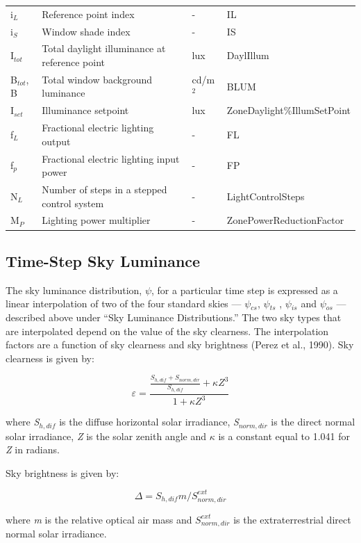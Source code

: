 \begin{longtable}[c]{p{1.0in}p{2.0in}p{1.0in}p{2.0in}}
i\(_{L}\) & Reference point index & - & IL \tabularnewline
i\(_{S}\) & Window shade index & - & IS \tabularnewline
I\(_{tot}\) & Total daylight illuminance at reference point & lux & DaylIllum \tabularnewline
B\(_{tot}\), B & Total window background luminance & cd/m\(^{2}\) & BLUM \tabularnewline
I\(_{set}\) & Illuminance setpoint & lux & ZoneDaylight\%IllumSetPoint \tabularnewline
f\(_{L}\) & Fractional electric lighting output & - & FL \tabularnewline
f\(_{p}\) & Fractional electric lighting input power & - & FP \tabularnewline
N\(_{L}\) & Number of steps in a stepped control system & - & LightControlSteps \tabularnewline
M\(_{P}\) & Lighting power multiplier & - & ZonePowerReductionFactor \tabularnewline
\bottomrule
\end{longtable}

\subsection{Time-Step Sky Luminance}\label{time-step-sky-luminance}

The sky luminance distribution, \emph{$\psi$}, for a particular time step is expressed as a linear interpolation of two of the four standard skies --- \emph{$\psi$\(_{cs}\)}, \emph{$\psi$\(_{ts}\)} , \emph{$\psi$\(_{is}\)} and \emph{$\psi$\(_{os}\)} --- described above under ``Sky Luminance Distributions.'' The two sky types that are interpolated depend on the value of the sky clearness. The interpolation factors are a function of sky clearness and sky brightness (Perez et al., 1990). Sky clearness is given by:

\begin{equation}
\varepsilon  = \frac{{\frac{{{S_{h,dif}} + {S_{norm,dir}}}}{{{S_{h,dif}}}} + \kappa {Z^3}}}{{1 + \kappa {Z^3}}}
\end{equation}

where \emph{S\(_{h,dif}\)} is the diffuse horizontal solar irradiance, \emph{S\(_{norm,dir}\)} is the direct normal solar irradiance, \emph{Z} is the solar zenith angle and \emph{$\kappa$} is a constant equal to 1.041 for \emph{Z} in radians.

Sky brightness is given by:

\begin{equation}
\Delta  = {S_{h,dif}}m/S_{norm,dir}^{ext}
\end{equation}

where \emph{m} is the relative optical air mass and \(S_{norm,dir}^{ext}\) is the extraterrestrial direct normal solar irradiance.

